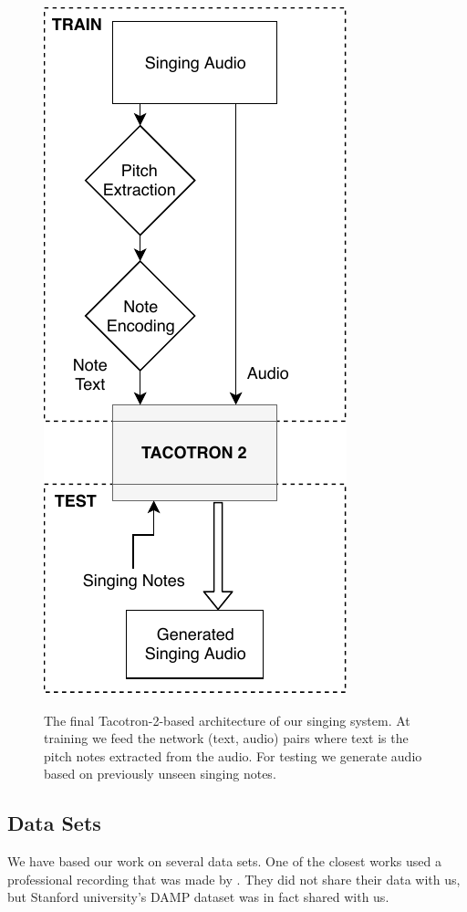 \documentclass{article}
\begin{document}
\begin{figure}[ht]
	\vskip 0.2in
	\begin{center}
		{\includegraphics[width=0.7\columnwidth]{figures/network_arch.pdf}}
		\caption{The final Tacotron-2-based architecture of our singing system.
			At training we feed the network (text, audio) pairs where text
			is the pitch notes extracted from the audio.
			For testing we generate audio based on previously unseen singing notes.}
		\label{network-arch}
	\end{center}
	\vskip -0.2in
\end{figure}
\subsection*{Data Sets}
We have based our work on several data sets.
One of the closest works used a professional recording that was made by \cite{blaauw2017neural}.
They did not share their data with us, but Stanford university's DAMP dataset was in fact shared with us.
\end{document}
